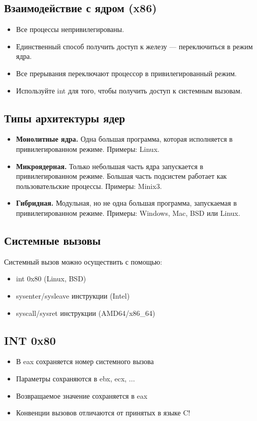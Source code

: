 \subsection{Взаимодействие с ядром (x86)}

\begin{itemize}
	\item Все процессы непривилегированы.
	\item Единственный способ получить доступ к железу --- переключиться в 
	режим ядра.
	\item Все прерывания переключают процессор в привилегированный режим.
	\item Используйте int для того, чтобы получить доступ к системным вызовам.
\end{itemize}

\subsection{Типы архитектуры ядер}

\begin{itemize}
	\item \textbf{Монолитные ядра.} Одна большая программа, которая исполняется 
	в привилегированном режиме. Примеры: Linux.
	\item \textbf{Микроядерная.} Только небольшая часть ядра запускается в привилегированном
	режиме. Большая часть подсистем работает как пользовательские процессы. Примеры: Minix3.
	\item \textbf{Гибридная.} Модульная, но не одна большая программа, запускаемая в
	привилегированном режиме. Примеры: Windows, Mac, BSD или Linux.
\end{itemize}

\subsection{Системные вызовы}

Системный вызов можно осуществить с помощью:
\begin{itemize}
	\item int 0x80 (Linux, BSD)
	\item sysenter/sysleave инструкции (Intel)
	\item syscall/sysret инструкции (AMD64/x86\_64)
\end{itemize}

\subsection{INT 0x80}

\begin{itemize}
	\item В eax сохраняется номер системного вызова
	\item Параметры сохраняются в ebx, ecx, ...
	\item Возвращаемое значение сохраняется в eax
	\item Конвенции вызовов отличаются от принятых в языке C!
\end{itemize}







